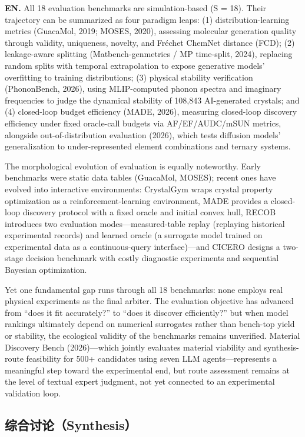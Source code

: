 \documentclass[11pt,a4paper]{ctexart}
\begin{document}
\textbf{EN.} All 18 evaluation benchmarks are simulation-based (S = 18). Their trajectory can be summarized as four paradigm leaps: (1) distribution-learning metrics (GuacaMol, 2019; MOSES, 2020), assessing molecular generation quality through validity, uniqueness, novelty, and Fr\'echet ChemNet distance (FCD); (2) leakage-aware splitting (Matbench-genmetrics / MP time-split, 2024), replacing random splits with temporal extrapolation to expose generative models' overfitting to training distributions; (3) physical stability verification (PhononBench, 2026), using MLIP-computed phonon spectra and imaginary frequencies to judge the dynamical stability of 108,843 AI-generated crystals; and (4) closed-loop budget efficiency (MADE, 2026), measuring closed-loop discovery efficiency under fixed oracle-call budgets via AF/EF/AUDC/mSUN metrics, alongside out-of-distribution evaluation (2026), which tests diffusion models' generalization to under-represented element combinations and ternary systems.

The morphological evolution of evaluation is equally noteworthy. Early benchmarks were static data tables (GuacaMol, MOSES); recent ones have evolved into interactive environments: CrystalGym wraps crystal property optimization as a reinforcement-learning environment, MADE provides a closed-loop discovery protocol with a fixed oracle and initial convex hull, RECOB introduces two evaluation modes---measured-table replay (replaying historical experimental records) and learned oracle (a surrogate model trained on experimental data as a continuous-query interface)---and CICERO designs a two-stage decision benchmark with costly diagnostic experiments and sequential Bayesian optimization.

Yet one fundamental gap runs through all 18 benchmarks: none employs real physical experiments as the final arbiter. The evaluation objective has advanced from ``does it fit accurately?'' to ``does it discover efficiently?'' but when model rankings ultimately depend on numerical surrogates rather than bench-top yield or stability, the ecological validity of the benchmarks remains unverified. Material Discovery Bench (2026)---which jointly evaluates material viability and synthesis-route feasibility for 500+ candidates using seven LLM agents---represents a meaningful step toward the experimental end, but route assessment remains at the level of textual expert judgment, not yet connected to an experimental validation loop.

\subsection*{综合讨论（Synthesis）}
\end{document}
